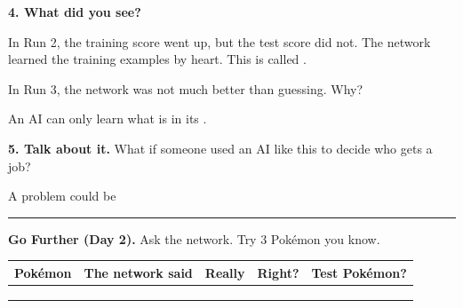 \documentclass[11pt]{article}
\begin{document}
\newpage


{\large\textbf{4. What did you see?}}

\vspace{0.5em}
In Run 2, the training score went up, but the test score did not. The network learned the training examples by heart. This is called .

\vspace{0.9em}
In Run 3, the network was not much better than guessing. Why? 

\vspace{0.9em}
An AI can only learn what is in its .

\vspace{1.1em}
{\large\textbf{5. Talk about it.}} What if someone used an AI like this to decide who gets a job?

\vspace{0.6em}
A problem could be 

\vspace{0.9em}
\blank{6.9in}

\vspace{1.2em}
\hrule
\vspace{0.8em}
{\large\textbf{Go Further (Day 2).}} Ask the network. Try 3 Pokémon you know.

\vspace{0.3em}
\begin{tabular}{|R{1.5in}|R{1.5in}|R{1.5in}|c|c|}
\hline
\textbf{Pokémon} & \textbf{The network said} & \textbf{Really} & \textbf{Right?} & \textbf{Test Pokémon?} \\ \hline
{} & & & & \\[0.4em] \hline
 & & & & \\[0.4em] \hline
 & & & & \\[0.4em] \hline
\end{tabular}

\vspace{1.1em}
\end{document}
